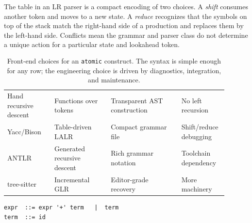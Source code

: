The table in an LR parser is a compact encoding of two choices. A \emph{shift} consumes another token and moves to a new state. A \emph{reduce} recognizes that the symbols on top of the stack match the right-hand side of a production and replaces them by the left-hand side. Conflicts mean the grammar and parser class do not determine a unique action for a particular state and lookahead token.

\begin{table}[htbp]
\centering
\begin{tabular}{M{0.20\linewidth}M{0.24\linewidth}M{0.30\linewidth}M{0.16\linewidth}}
\hline
{} &  &  &  \\
\hline
Hand recursive descent & Functions over tokens & Transparent AST construction & No left recursion \\
Yacc/Bison & Table-driven LALR & Compact grammar file & Shift/reduce debugging \\
ANTLR & Generated recursive descent & Rich grammar notation & Toolchain dependency \\
tree-sitter & Incremental GLR & Editor-grade recovery & More machinery \\
\hline
\end{tabular}
\caption{Front-end choices for an \texttt{atomic} construct. The syntax is simple enough for any row; the engineering choice is driven by diagnostics, integration, and maintenance.}
\label{tab:front-end-choices}
\end{table}

\begin{lstlisting}[language={}, caption={A grammar small enough to see the whole automaton, written in Yacc-style BNF.}, label={lst:expr-grammar}]
expr  ::= expr '+' term   |  term
term  ::= id
\end{lstlisting}

